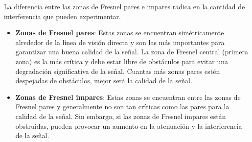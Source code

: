 \documentclass[
	12pt, %
	fleqn, %
	a4paper, %
	oneside, %
]{LegrandOrangeBook}
\begin{document}
\begin{notation}
La diferencia entre las zonas de Fresnel pares e impares radica en la cantidad de interferencia que pueden experimentar.
\begin{itemize}
\item \textbf{Zonas de Fresnel pares}: Estas zonas se encuentran simétricamente alrededor de la línea de visión directa y son las más importantes para garantizar una buena calidad de la señal. La zona de Fresnel central (primera zona) es la más crítica y debe estar libre de obstáculos para evitar una degradación significativa de la señal. Cuantas más zonas pares estén despejadas de obstáculos, mejor será la calidad de la señal.
\item \textbf{Zonas de Fresnel impares}: Estas zonas se encuentran entre las zonas de Fresnel pares y generalmente no son tan críticas como las pares para la calidad de la señal. Sin embargo, si las zonas de Fresnel impares están obstruidas, pueden provocar un aumento en la atenuación y la interferencia de la señal.
\end{itemize}
\end{notation}
\end{document}
